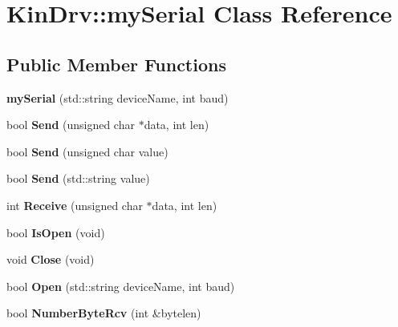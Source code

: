 \hypertarget{classKinDrv_1_1mySerial}{\section{Kin\+Drv\+:\+:my\+Serial Class Reference}
\label{classKinDrv_1_1mySerial}
}
\subsection*{Public Member Functions}
\begin{DoxyCompactItemize}
\item 
\hypertarget{classKinDrv_1_1mySerial_a2e1348a8a2ca2e6d3c54b1a9d4cac97e}{{\bfseries my\+Serial} (std\+::string device\+Name, int baud)}\label{classKinDrv_1_1mySerial_a2e1348a8a2ca2e6d3c54b1a9d4cac97e}

\item 
\hypertarget{classKinDrv_1_1mySerial_aaa0709c2a0da6caa74b51920651f41b0}{bool {\bfseries Send} (unsigned char $\ast$data, int len)}\label{classKinDrv_1_1mySerial_aaa0709c2a0da6caa74b51920651f41b0}

\item 
\hypertarget{classKinDrv_1_1mySerial_afda95bdbda913daae413f11e9c797d0b}{bool {\bfseries Send} (unsigned char value)}\label{classKinDrv_1_1mySerial_afda95bdbda913daae413f11e9c797d0b}

\item 
\hypertarget{classKinDrv_1_1mySerial_a8b5a2ddfef3eed88c01784bbb75b95fd}{bool {\bfseries Send} (std\+::string value)}\label{classKinDrv_1_1mySerial_a8b5a2ddfef3eed88c01784bbb75b95fd}

\item 
\hypertarget{classKinDrv_1_1mySerial_a2b31cda80376328f8ea3bc6b8b96f8f0}{int {\bfseries Receive} (unsigned char $\ast$data, int len)}\label{classKinDrv_1_1mySerial_a2b31cda80376328f8ea3bc6b8b96f8f0}

\item 
\hypertarget{classKinDrv_1_1mySerial_aa2586cbe30e33eb1a74d3f5d998c7a73}{bool {\bfseries Is\+Open} (void)}\label{classKinDrv_1_1mySerial_aa2586cbe30e33eb1a74d3f5d998c7a73}

\item 
\hypertarget{classKinDrv_1_1mySerial_a69d4a59899800a927334001449dda0b2}{void {\bfseries Close} (void)}\label{classKinDrv_1_1mySerial_a69d4a59899800a927334001449dda0b2}

\item 
\hypertarget{classKinDrv_1_1mySerial_a0e2518ebb88dd17a290c47684b210d00}{bool {\bfseries Open} (std\+::string device\+Name, int baud)}\label{classKinDrv_1_1mySerial_a0e2518ebb88dd17a290c47684b210d00}

\item 
\hypertarget{classKinDrv_1_1mySerial_aa57af296af4d11f53c51cf3e676a551e}{bool {\bfseries Number\+Byte\+Rcv} (int \&bytelen)}\label{classKinDrv_1_1mySerial_aa57af296af4d11f53c51cf3e676a551e}

\end{DoxyCompactItemize}
